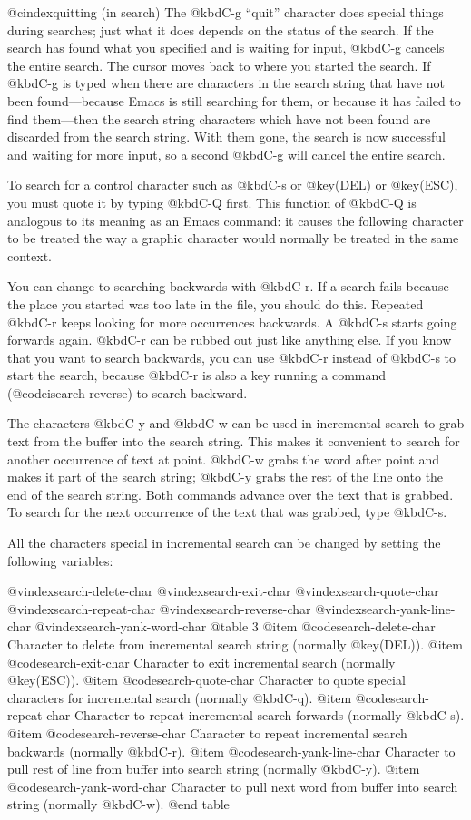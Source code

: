 {{{{{{@cindex{quitting (in search)}
  The @kbd{C-g} ``quit'' character does special things during searches; just
what it does depends on the status of the search.  If the search has found
what you specified and is waiting for input, @kbd{C-g} cancels the entire
search.  The cursor moves back to where you started the search.  If
@kbd{C-g} is typed when there are characters in the search string that have
not been found---because Emacs is still searching for them, or because it
has failed to find them---then the search string characters which have not
been found are discarded from the search string.  With them gone, the
search is now successful and waiting for more input, so a second @kbd{C-g}
will cancel the entire search.

  To search for a control character such as @kbd{C-s} or @key(DEL) or
@key(ESC), you must quote it by typing @kbd{C-Q} first.  This function of
@kbd{C-Q} is analogous to its meaning as an Emacs command: it causes the
following character to be treated the way a graphic character would
normally be treated in the same context.

  You can change to searching backwards with @kbd{C-r}.  If a search fails
because the place you started was too late in the file, you should do this.
Repeated @kbd{C-r} keeps looking for more occurrences backwards.  A
@kbd{C-s} starts going forwards again.  @kbd{C-r} can be rubbed out just
like anything else.  If you know that you want to search backwards, you can
use @kbd{C-r} instead of @kbd{C-s} to start the search, because @kbd{C-r}
is also a key running a command (@code{isearch-reverse}) to search backward.

  The characters @kbd{C-y} and @kbd{C-w} can be used in incremental search
to grab text from the buffer into the search string.  This makes it
convenient to search for another occurrence of text at point.  @kbd{C-w}
grabs the word after point and makes it part of the search string;
@kbd{C-y} grabs the rest of the line onto the end of the search string.
Both commands advance over the text that is grabbed.  To search for the
next occurrence of the text that was grabbed, type @kbd{C-s}.

  All the characters special in incremental search can be changed by setting
the following variables:

@vindex{search-delete-char}
@vindex{search-exit-char}
@vindex{search-quote-char}
@vindex{search-repeat-char}
@vindex{search-reverse-char}
@vindex{search-yank-line-char}
@vindex{search-yank-word-char}
@table 3
@item @code{search-delete-char}
Character to delete from incremental search string (normally @key(DEL)).
@item @code{search-exit-char}
Character to exit incremental search (normally @key(ESC)).
@item @code{search-quote-char}
Character to quote special characters for incremental search (normally @kbd{C-q}).
@item @code{search-repeat-char}
Character to repeat incremental search forwards (normally @kbd{C-s}).
@item @code{search-reverse-char}
Character to repeat incremental search backwards (normally @kbd{C-r}).
@item @code{search-yank-line-char}
Character to pull rest of line from buffer into search string (normally @kbd{C-y}).
@item @code{search-yank-word-char}
Character to pull next word from buffer into search string (normally @kbd{C-w}).
@end table

}}}}}}
